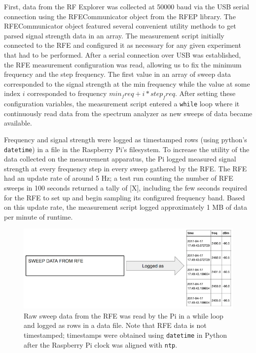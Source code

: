 \documentclass[pageno]{jpaper}
\begin{document}
First, data from the RF Explorer was collected at 50000 baud via the USB serial connection using the RFECommunicator object from the RFEP library. The RFECommunicator object featured several convenient utility methods to get parsed signal strength data in an array. The measurement script initially connected to the RFE and configured it as necessary for any given experiment that had to be performed. After a serial connection over USB was established, the RFE measurement configuration was read, allowing us to fix the minimum frequency and the step frequency. The first value in an array of sweep data corresponded to the signal strength at the min frequency while the value at some index $i$ corresponded to frequency $min_freq + i*step_freq$. After setting these configuration variables,  the measurement script entered a \texttt{while} loop where it continuously read data from the spectrum analyzer as new sweeps of data became available.

Frequency and signal strength were logged as timestamped rows (using python's \texttt{datetime}) in a file in the Raspberry Pi's filesystem. To increase the utility of the data collected on the measurement apparatus, the Pi logged measured signal strength at every frequency step in every sweep gathered by the RFE. The RFE had an update rate of around 5 Hz; a test run counting the number of RFE sweeps in 100 seconds returned a tally of [X], including the few seconds required for the RFE to set up and begin sampling its configured frequency band. Based on this update rate, the measurement script logged approximately 1 MB of data per minute of runtime. 

\begin{figure}[h]
 	\caption{Raw sweep data from the RFE was read by the Pi in a while loop and logged as rows in a data file. Note that RFE data is not timestamped; timestamps were obtained using \texttt{datetime} in Python after the Raspberry Pi clock was aligned with \texttt{ntp}.}
 	\includegraphics{rfe_data}
 	\centering
\end{figure}
\end{document}
